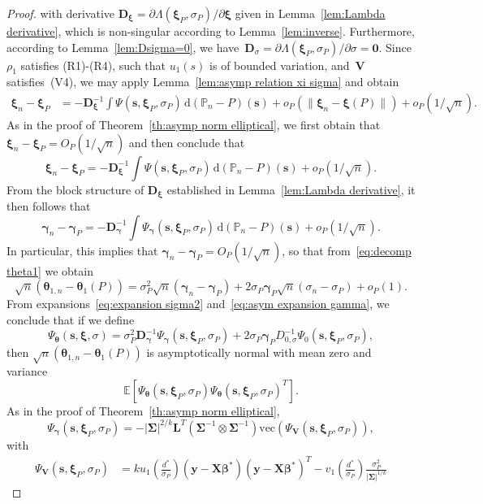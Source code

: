 \documentclass{article}
\numberwithin{equation}{section}
\theoremstyle{plain}
\newcommand{\dd}{\mathrm{d}}
\newcommand{\vc}{\mathrm{vec}}
\newcommand{\bbeta}{\bm\beta}
\newcommand{\btheta}{\bm\theta}
\newcommand{\bxi}{\bm\xi}
\newcommand{\bgamma}{\bm\gamma}
\newcommand{\bSigma}{\mathbf{\Sigma}}
\newcommand{\by}{\mathbf{y}}
\newcommand{\bs}{\mathbf{s}}
\newcommand{\bX}{\mathbf{X}}
\newcommand{\bV}{\mathbf{V}}
\newcommand{\bD}{\mathbf{D}}
\newcommand{\bL}{\mathbf{L}}
\newcommand{\E}{\mathbb{E}}
\begin{document}
\begin{proof}
with derivative $\bD_{\bxi}=\partial\Lambda(\bxi_P,\sigma_P)/\partial\bxi$ given in
Lemma~\ref{lem:Lambda derivative}, 
which is non-singular according to Lemma~\ref{lem:inverse}.
Furthermore, according to Lemma~\ref{lem:Dsigma=0}, we have~$\bD_{\sigma}=\partial\Lambda(\bxi_P,\sigma_P)/\partial\sigma=\mathbf{0}$.
Since $\rho_1$ satisfies (R1)-(R4), such that $u_1(s)$ is of bounded variation,
and~$\bV$ satisfies~(V4), we may apply Lemma~\ref{lem:asymp relation xi sigma} and obtain
\[
\begin{split}
\bxi_n-\bxi_P
&=
-\bD_{\bxi}^{-1}
\int 
\Psi(\mathbf{s},\bxi_P,\sigma_P)\,\dd (\mathbb{P}_n-P)(\mathbf{s})
+
o_P(\|\bxi_n-\bxi(P)\|)
+
o_P(1/\sqrt{n}).
\end{split}
\]
As in the proof of Theorem~\ref{th:asymp norm elliptical},
we first obtain that $\bxi_n-\bxi_P=O_P(1/\sqrt{n})$ and then conclude that
\[
\bxi_n-\bxi_P
=
-\bD_{\bxi}^{-1}
\int \Psi(\mathbf{s},\bxi_P,\sigma_P)\,\dd (\mathbb{P}_n-P)(\mathbf{s})
+
o_P(1/\sqrt{n}).
\]
From the block structure of $\bD_{\bxi}$ established in Lemma~\ref{lem:Lambda derivative},
it then follows that 
\begin{equation}
\label{eq:asym expansion gamma}
\bgamma_n-\bgamma_P
=
-\bD_{\bgamma}^{-1}
\int \Psi_{\bgamma}(\mathbf{s},\bxi_P,\sigma_P)\,\dd (\mathbb{P}_n-P)(\mathbf{s})
+
o_P(1/\sqrt{n}).
\end{equation}
In particular, this implies that $\bgamma_n-\bgamma_P=O_P(1/\sqrt{n})$, so that
from~\eqref{eq:decomp theta1} we obtain
\[
\sqrt{n}(\btheta_{1,n}-\btheta_1(P))
=
\sigma^2_P
\sqrt{n}(\bgamma_n-\bgamma_P)
+
2\sigma_P\bgamma_P
\sqrt{n}(\sigma_n-\sigma_P)+o_P(1).
\]
From expansions~\eqref{eq:expansion sigma2} and~\eqref{eq:asym expansion gamma}, 
we conclude that if we define
\[
\Psi_{\btheta}(\bs,\bxi,\sigma)
=
\sigma^2_P
\bD_{\bgamma}^{-1}
\Psi_{\bgamma}(\bs,\bxi_P,\sigma_P)
+
2\sigma_P\bgamma_P
D_{0,\sigma}^{-1}
\Psi_{0}(\bs,\bxi_P,\sigma_P),
\]
then $\sqrt{n}(\btheta_{1,n}-\btheta_1(P))$ is asymptotically normal with mean zero and variance
\[
\E\left[
\Psi_{\btheta}(\bs,\bxi_P,\sigma_P)
\Psi_{\btheta}(\bs,\bxi_P,\sigma_P)^T
\right].
\]
As in the proof of Theorem~\ref{th:asymp norm elliptical},
\[
\Psi_{\bgamma}(\bs,\bxi_P,\sigma_P)
=
-
|\bSigma|^{2/k}
\bL^T
\left(
\bSigma^{-1}
\otimes
\bSigma^{-1}
\right)
\vc\left(
\Psi_\bV(\bs,\bxi_P,\sigma_P)
\right),
\]
with
\[
\begin{split}
\Psi_\bV(\bs,\bxi_P,\sigma_P)
&=
k
u_1\left(\frac{d^*}{\sigma_P}\right)
(\by-\bX\bbeta^*)(\by-\bX\bbeta^*)^T
-
v_1\left(\frac{d^*}{\sigma_P}\right)
\frac{\sigma_P^2}{|\bSigma|^{1/k}}

\end{split}\]
\end{proof}
\end{document}
